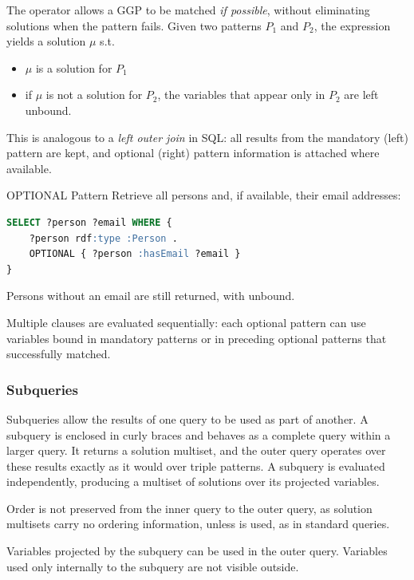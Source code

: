 The  operator allows a GGP to be matched \emph{if possible}, without eliminating solutions when the pattern fails. 
Given two patterns \(P_1\) and \(P_2\), the expression  yields a solution \(\mu\) s.t. 
\begin{itemize}
    \item \(\mu\) is a solution for \(P_1\)
    \item if \(\mu\) is not a solution for \(P_2\), the variables that appear only in \(P_2\) are left unbound.
\end{itemize}
This is analogous to a \emph{left outer join} in SQL: all results from the mandatory (left) pattern are kept, and optional (right) pattern information is attached where available.

\begin{example}{OPTIONAL Pattern}
    Retrieve all persons and, if available, their email addresses:
    \begin{lstlisting}[language=SQL, caption={Using OPTIONAL for missing data}]
SELECT ?person ?email WHERE {
    ?person rdf:type :Person .
    OPTIONAL { ?person :hasEmail ?email }
}
    \end{lstlisting}
    Persons without an email are still returned, with  unbound.
\end{example}

Multiple  clauses are evaluated sequentially: each optional pattern can use variables bound in mandatory patterns or in preceding optional patterns that successfully matched.

\subsubsection{Subqueries}

Subqueries allow the results of one query to be used as part of another. A subquery is enclosed in curly braces and behaves as a complete  query within a larger query. 
It returns a solution multiset, and the outer query operates over these results exactly as it would over triple patterns.
A subquery is evaluated independently, producing a multiset of solutions over its projected variables.

Order is not preserved from the inner query to the outer query, as solution multisets carry no ordering information, unless  is used, as in standard queries.

Variables projected by the subquery can be used in the outer query. Variables used only internally to the subquery are not visible outside.

